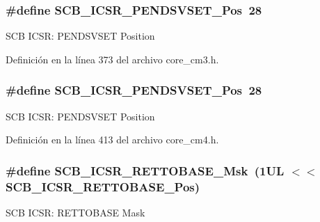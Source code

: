 \subsubsection[{\texorpdfstring{S\+C\+B\+\_\+\+I\+C\+S\+R\+\_\+\+P\+E\+N\+D\+S\+V\+S\+E\+T\+\_\+\+Pos}{SCB_ICSR_PENDSVSET_Pos}}]{\setlength{\rightskip}{0pt plus 5cm}\#define S\+C\+B\+\_\+\+I\+C\+S\+R\+\_\+\+P\+E\+N\+D\+S\+V\+S\+E\+T\+\_\+\+Pos~28}\hypertarget{group___c_m_s_i_s___s_c_b_gab5ded23d2ab1d5ff7cc7ce746205e9fe}{}\label{group___c_m_s_i_s___s_c_b_gab5ded23d2ab1d5ff7cc7ce746205e9fe}
S\+CB I\+C\+SR\+: P\+E\+N\+D\+S\+V\+S\+ET Position 

Definición en la línea 373 del archivo core\+\_\+cm3.\+h.

\subsubsection[{\texorpdfstring{S\+C\+B\+\_\+\+I\+C\+S\+R\+\_\+\+P\+E\+N\+D\+S\+V\+S\+E\+T\+\_\+\+Pos}{SCB_ICSR_PENDSVSET_Pos}}]{\setlength{\rightskip}{0pt plus 5cm}\#define S\+C\+B\+\_\+\+I\+C\+S\+R\+\_\+\+P\+E\+N\+D\+S\+V\+S\+E\+T\+\_\+\+Pos~28}\hypertarget{group___c_m_s_i_s___s_c_b_gab5ded23d2ab1d5ff7cc7ce746205e9fe}{}\label{group___c_m_s_i_s___s_c_b_gab5ded23d2ab1d5ff7cc7ce746205e9fe}
S\+CB I\+C\+SR\+: P\+E\+N\+D\+S\+V\+S\+ET Position 

Definición en la línea 413 del archivo core\+\_\+cm4.\+h.

\subsubsection[{\texorpdfstring{S\+C\+B\+\_\+\+I\+C\+S\+R\+\_\+\+R\+E\+T\+T\+O\+B\+A\+S\+E\+\_\+\+Msk}{SCB_ICSR_RETTOBASE_Msk}}]{\setlength{\rightskip}{0pt plus 5cm}\#define S\+C\+B\+\_\+\+I\+C\+S\+R\+\_\+\+R\+E\+T\+T\+O\+B\+A\+S\+E\+\_\+\+Msk~(1\+U\+L $<$$<$ S\+C\+B\+\_\+\+I\+C\+S\+R\+\_\+\+R\+E\+T\+T\+O\+B\+A\+S\+E\+\_\+\+Pos)}\hypertarget{group___c_m_s_i_s___s_c_b_gaca6fc3f79bb550f64fd7df782ed4a5f6}{}\label{group___c_m_s_i_s___s_c_b_gaca6fc3f79bb550f64fd7df782ed4a5f6}
S\+CB I\+C\+SR\+: R\+E\+T\+T\+O\+B\+A\+SE Mask 

